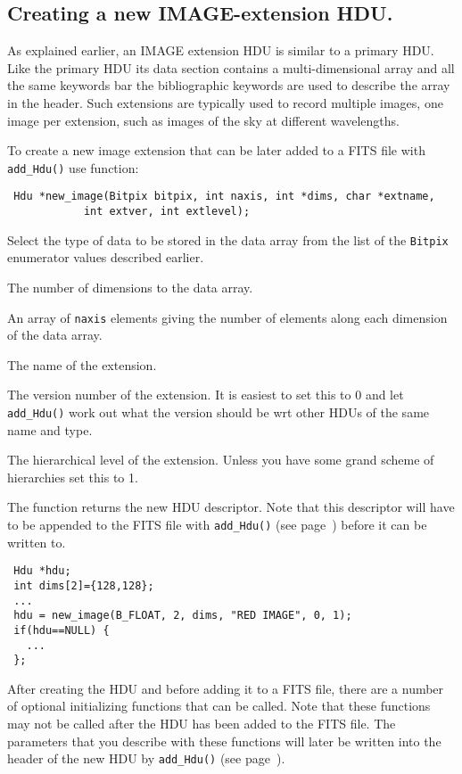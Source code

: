 \subsection{Creating a new IMAGE-extension HDU.}

As explained earlier, an IMAGE extension HDU is similar to a primary
HDU.  Like the primary HDU its data section contains a
multi-dimensional array and all the same keywords bar the
bibliographic keywords are used to describe the array in the header.
Such extensions are typically used to record multiple images, one
image per extension, such as images of the sky at different
wavelengths.

To create a new image extension that can be later added to a FITS file
with \verb`add_Hdu()` use function:
\label{new_image}\begin{verbatim}
 Hdu *new_image(Bitpix bitpix, int naxis, int *dims, char *extname,
	        int extver, int extlevel);
\end{verbatim}
\begin{arglist}
  Select the type of data to be stored in the data array
            from the list of the \verb`Bitpix` enumerator values
            described earlier.  

  The number of dimensions to the data array.

  An array of \verb`naxis` elements giving the
            number of elements along each dimension of the data array.

 The name of the extension.

 The version number of the extension. It is easiest to set
            this to 0 and let \verb`add_Hdu()` work out what the version
            should be wrt other HDUs of the same name and type.

 The hierarchical level of the extension. Unless you have
            some grand scheme of hierarchies set this to 1.
\end{arglist}

The function returns the new HDU descriptor. Note that this descriptor
will have to be appended to the FITS file with \verb`add_Hdu()` (see
page~\pageref{add_Hdu}) before it can be written to.

\begin{verbatim}
 Hdu *hdu;
 int dims[2]={128,128};
 ...
 hdu = new_image(B_FLOAT, 2, dims, "RED IMAGE", 0, 1);
 if(hdu==NULL) {
   ...
 };
\end{verbatim}
After creating the HDU and before adding it to a FITS file, there are
a number of optional initializing functions that can be called. Note
that these functions may not be called after the HDU has been added to
the FITS file. The parameters that you describe with these functions
will later be written into the header of the new HDU by
\verb`add_Hdu()` (see page~\pageref{add_Hdu}).

